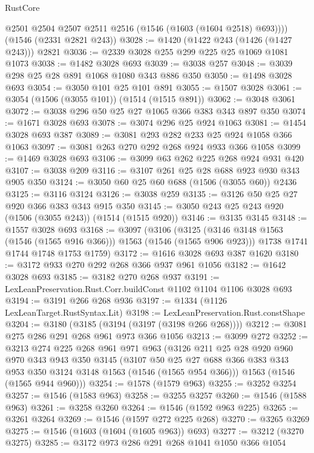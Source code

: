 \begin{lexlean}{RustCore}
\begin{coremodule}
        @2501
        @2504
        @2507
        @2511
        @2516
        (@1546 (@1603 (@1604 @2518) @693))))
    (@1546 (@2331 @2821 @243))
@3028 := @1420 (@1422 @243 (@1426 (@1427 @243))) @2821
@3036 := @2339 @3028 @255 @299 @225 @25 @1069 @1081 @1073
@3038 := @1482 @3028 @693
@3039 := @3038 @257
@3048 := @3039 @298 @25 @28 @891 @1068 @1080 @343 @886 @350
@3050 := @1498 @3028 @693
@3054 := @3050 @101 @25 @101 @891
@3055 := @1507 @3028
@3061 := @3054 (@1506 (@3055 @101)) (@1514 (@1515 @891))
@3062 := @3048 @3061
@3072 := @3038 @296 @50 @25 @27 @1065 @366 @383 @343 @897 @350
@3074 := @1671 @3028 @693
@3078 := @3074 @296 @25 @924 @1063
@3081 := @1454 @3028 @693 @387
@3089 := @3081 @293 @282 @233 @25 @924 @1058 @366 @1063
@3097 := @3081 @263 @270 @292 @268 @924 @933 @366 @1058
@3099 := @1469 @3028 @693
@3106 := @3099 @63 @262 @225 @268 @924 @931 @420
@3107 := @3038 @209
@3116 := @3107 @261 @25 @28 @688 @923 @930 @343 @905 @350
@3124 := @3050 @60 @25 @60 @688 (@1506 (@3055 @60)) @2436
@3125 := @3116 @3124
@3126 := @3038 @259
@3135 := @3126 @50 @25 @27 @920 @366 @383 @343 @915 @350
@3145 := @3050 @243 @25 @243 @920 (@1506 (@3055 @243)) (@1514 (@1515 @920))
@3146 := @3135 @3145
@3148 := @1557 @3028 @693
@3168 := @3097
    (@3106
      (@3125 (@3146 @3148 @1563 (@1546 (@1565 @916 @366))) @1563 (@1546 (@1565 @906 @923)))
      @1738
      @1741
      @1744
      @1748
      @1753
      @1759)
@3172 := @1616 @3028 @693 @387 @1620
@3180 := @3172 @933 @270 @292 @268 @366 @937 @961 @1056
@3182 := @1642 @3028 @693
@3185 := @3182 @270 @268 @937
@3191 := LexLeanPreservation.Rust.Corr.buildConst @1102 @1104 @1106 @3028 @693
@3194 := @3191 @266 @268 @936
@3197 := @1334 (@1126 LexLeanTarget.RustSyntax.Lit)
@3198 := LexLeanPreservation.Rust.constShape
@3204 := @3180 (@3185 (@3194 (@3197 (@3198 @266 @268))))
@3212 := @3081 @275 @286 @291 @268 @961 @973 @366 @1056
@3213 := @3099 @272
@3252 := @3213
    @274
    @225
    @268
    @961
    @971
    @963
    (@3126
      @211
      @25
      @28
      @920
      @960
      @970
      @343
      @943
      @350
      @3145
      (@3107 @50 @25 @27 @688 @366 @383 @343 @953 @350 @3124 @3148 @1563 (@1546 (@1565 @954 @366)))
      @1563
      (@1546 (@1565 @944 @960)))
@3254 := @1578 (@1579 @963)
@3255 := @3252 @3254
@3257 := @1546 (@1583 @963)
@3258 := @3255 @3257
@3260 := @1546 (@1588 @963)
@3261 := @3258 @3260
@3264 := @1546 (@1592 @963 @225)
@3265 := @3261 @3264
@3269 := @1546 (@1597 @272 @225 @268)
@3270 := @3265 @3269
@3275 := @1546 (@1603 (@1604 (@1605 @963)) @693)
@3277 := @3212 (@3270 @3275)
@3285 := @3172 @973 @286 @291 @268 @1041 @1050 @366 @1054

\end{coremodule}
\end{lexlean}
